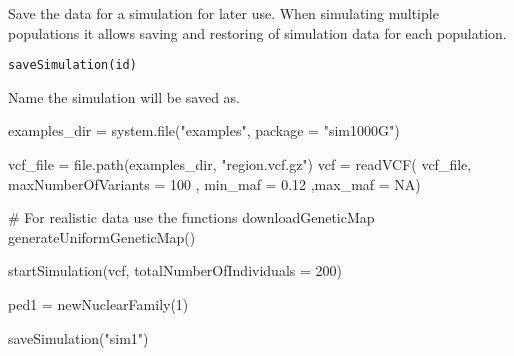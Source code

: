 \documentclass[letterpaper]{book}
\begin{document}
\begin{Examples}
\end{Examples}
%
\begin{Description}\relax
Save the data for a simulation for later use. When simulating multiple populations it
allows saving and restoring of simulation data for each population.
\end{Description}
%
\begin{Usage}
\begin{verbatim}
saveSimulation(id)
\end{verbatim}
\end{Usage}
%
\begin{Arguments}
\begin{ldescription}
\item[\code{id}] Name the simulation will be saved as.
\end{ldescription}
\end{Arguments}
%
\begin{Examples}
\begin{ExampleCode}



examples_dir = system.file("examples", package = "sim1000G")

vcf_file = file.path(examples_dir, "region.vcf.gz")
vcf = readVCF( vcf_file, maxNumberOfVariants = 100 ,
               min_maf = 0.12 ,max_maf = NA)


# For realistic data use the functions downloadGeneticMap
generateUniformGeneticMap()

startSimulation(vcf, totalNumberOfIndividuals = 200)

ped1 = newNuclearFamily(1)

saveSimulation("sim1")

\end{ExampleCode}
\end{Examples}
\end{document}

